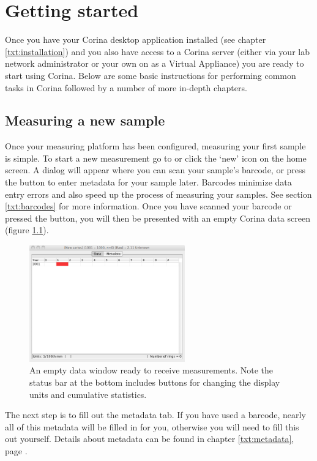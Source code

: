 
\chapter{Getting started}
\label{txt:gettingstarted}

Once you have your Corina desktop application installed (see chapter \ref{txt:installation}) and you also have access to a Corina server (either via your lab network administrator or your own on as a Virtual Appliance) you are ready to start using Corina.  Below are some basic instructions for performing common tasks in Corina followed by a number of more in-depth chapters.

\section{Measuring a new sample}
Once your measuring platform has been configured, measuring your first sample is simple.  To start a new measurement go to  or click the `new' icon on the home screen. A dialog will appear where you can scan your sample's barcode, or press the button to enter metadata for your sample later. Barcodes minimize data entry errors and also speed up the process of measuring your samples. See section \ref{txt:barcodes} for more information. Once you have scanned your barcode or pressed the button, you will then be presented with an empty Corina data screen (figure \ref{fig:datascreen}).

\begin{figure}[hbtp]
  \centering
    \includegraphics[width=0.6\textwidth]{Images/datascreen.png}
    \caption{An empty data window ready to receive measurements.  Note the status bar at the bottom includes buttons for changing the display units and cumulative statistics.}
    \label{fig:datascreen}
\end{figure}

The next step is to fill out the metadata tab. If you have used a barcode, nearly all of this metadata will be filled in for you, otherwise you will need to fill this out yourself. Details about metadata can be found in chapter \ref{txt:metadata}, page \pageref{txt:metadata}.


